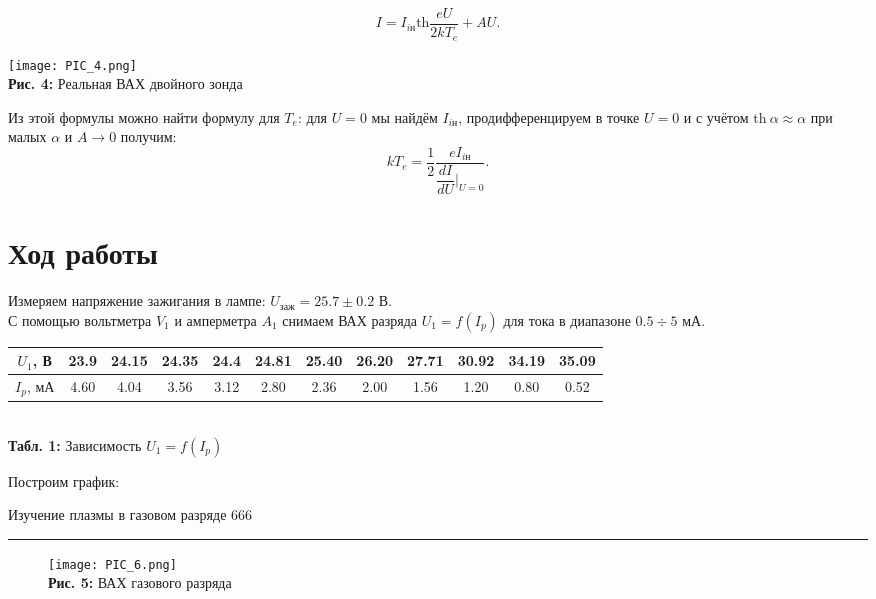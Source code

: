 \documentclass[12pt,a4paper]{scrartcl}
\begin{document}
\begin{equation}
I = I_{i\text{н}} \text{th}\dfrac{eU}{2kT_e} + AU.
\end{equation}

\begin{center}
\texttt{[image: PIC\_4.png]}
\\\textbf{Рис. 4:} Реальная ВАХ двойного зонда
\end{center}

Из этой формулы можно найти формулу для $T_e$: для $U=0$ мы найдём $I_{i\text{н}}$, продифференцируем в точке $U=0$ и с учётом $\text{th}~\alpha \approx \alpha$ при малых $\alpha$ и $A\rightarrow 0$ получим:
\begin{equation}
kT_e = \dfrac{1}{2}\dfrac{eI_{i\text{н}}}{\dfrac{dI}{dU}|_{U=0}}.
\end{equation}	
	
	
\section{Ход работы}
Измеряем напряжение зажигания в лампе: $U_{\text{заж}} = 25.7\pm 0.2$ В.\\
С помощью вольтметра $V_1$ и амперметра $A_1$ снимаем ВАХ разряда $U_1=f(I_p)$ для тока в диапазоне $0.5 \div 5$ мА.

\begin{table}[h]
\centering
\begin{tabular}{|c|c|c|c|c|c|c|c|c|c|c|c|}
\hline
$U_1$, В & 23.9 & 24.15 & 24.35 & 24.4 & 24.81 & 25.40 & 26.20 & 27.71 & 30.92 & 34.19 & 35.09 \\ \hline
$I_p$, мА & 4.60 & 4.04  & 3.56  & 3.12 & 2.80  & 2.36  & 2.00  & 1.56  & 1.20  & 0.80  & 0.52  \\ \hline
\end{tabular}
\\\textbf{Табл. 1:} Зависимость $U_1 = f(I_p)$
\end{table}

Построим график:


\newpage


	\begin{flushleft}
		\footnotesize{Изучение плазмы в газовом разряде} \hspace{\fill} \footnotesize{666}
		\\[-0.3cm]\noindent\rule{\textwidth}{0.3pt}
	\end{flushleft}	

\begin{figure}[h]
\centering
\texttt{[image: PIC\_6.png]}
\\\textbf{Рис. 5:} ВАХ газового разряда
\end{figure}
\end{document}
